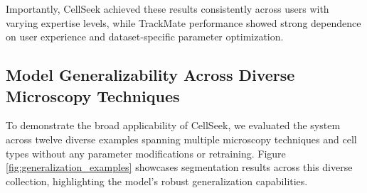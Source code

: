 \documentclass[../cellseek_paper.tex]{subfiles}
\begin{document}
Importantly, CellSeek achieved these results consistently across users with varying expertise levels, while TrackMate performance showed strong dependence on user experience and dataset-specific parameter optimization.

\subsection{Model Generalizability Across Diverse Microscopy Techniques}

To demonstrate the broad applicability of CellSeek, we evaluated the system across twelve diverse examples spanning multiple microscopy techniques and cell types without any parameter modifications or retraining. Figure \ref{fig:generalization_examples} showcases segmentation results across this diverse collection, highlighting the model's robust generalization capabilities.
\end{document}

